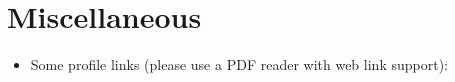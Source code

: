 \documentclass{resume}
\begin{document}




\section{Miscellaneous}
\begin{itemize}[parsep=0.25ex]
  \item Some profile links (please use a PDF reader with web link support):

\end{itemize}

%
%
\end{document}
